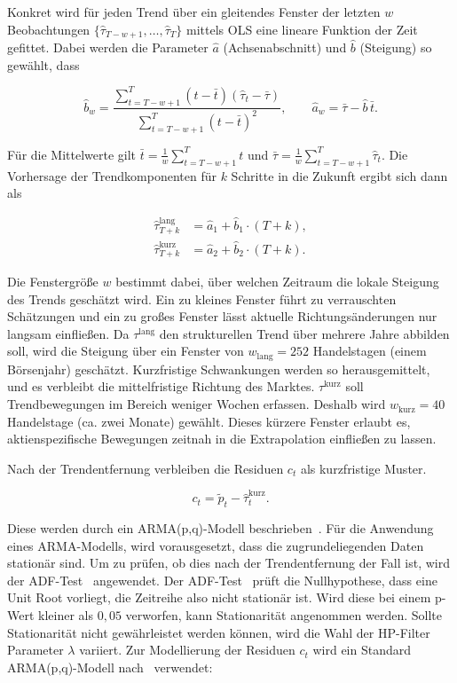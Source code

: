 Konkret wird für jeden Trend über ein gleitendes Fenster der letzten $w$ Beobachtungen $\{\hat{\tau}_{T-w+1}, \ldots, \hat{\tau}_T\}$ mittels \ac{OLS} eine lineare Funktion der Zeit gefittet. Dabei werden die Parameter $\hat{a}$ (Achsenabschnitt) und $\hat{b}$ (Steigung) so gewählt, dass

\begin{equation}
    \hat{b}_w = \frac{\sum_{t=T-w+1}^{T} (t - \bar{t})(\hat{\tau}_t - \bar{\tau})}{\sum_{t=T-w+1}^{T} (t - \bar{t})^2}, \qquad \hat{a}_w = \bar{\tau} - \hat{b}\,\bar{t}.
\end{equation}

Für die Mittelwerte gilt $\bar{t} = \frac{1}{w}\sum_{t=T-w+1}^{T} t$ und $\bar{\tau} = \frac{1}{w}\sum_{t=T-w+1}^{T} \hat{\tau}_t$. Die Vorhersage der Trendkomponenten für $k$ Schritte in die Zukunft ergibt sich dann als

\begin{align}
    \hat{\tau}^{\text{lang}}_{T+k} & = \hat{a}_1 + \hat{b}_1 \cdot (T+k), \\
    \hat{\tau}^{\text{kurz}}_{T+k} & = \hat{a}_2 + \hat{b}_2 \cdot (T+k).
\end{align}

Die Fenstergröße $w$ bestimmt dabei, über welchen Zeitraum die lokale Steigung des Trends geschätzt wird. Ein zu kleines Fenster führt zu verrauschten Schätzungen und ein zu großes Fenster lässt aktuelle Richtungsänderungen nur langsam einfließen. Da $\tau^{\text{lang}}$ den strukturellen Trend über mehrere Jahre abbilden soll, wird die Steigung über ein Fenster von $w_{\text{lang}} = 252$ Handelstagen (einem Börsenjahr) geschätzt. Kurzfristige Schwankungen werden so herausgemittelt, und es verbleibt die mittelfristige Richtung des Marktes. $\tau^{\text{kurz}}$ soll Trendbewegungen im Bereich weniger Wochen erfassen. Deshalb wird $w_{\text{kurz}} = 40$ Handelstage (ca. zwei Monate) gewählt. Dieses kürzere Fenster erlaubt es, aktienspezifische Bewegungen zeitnah in die Extrapolation einfließen zu lassen.

Nach der Trendentfernung verbleiben die Residuen $c_t$ als kurzfristige Muster.

\[
    c_t = \tilde{p}_t - \hat{\tau}^{\text{kurz}}_t.
\]

Diese werden durch ein \ac{ARMA}(p,q)-Modell beschrieben~\cite{box2015time}. Für die Anwendung eines \ac{ARMA}-Modells, wird vorausgesetzt, dass die zugrundeliegenden Daten stationär sind. Um zu prüfen, ob dies nach der Trendentfernung der Fall ist, wird der \ac{ADF}-Test~\cite{dickey1979distribution} angewendet. Der \ac{ADF}-Test~\cite{dickey1979distribution} prüft die Nullhypothese, dass eine Unit Root vorliegt, die Zeitreihe also nicht stationär ist. Wird diese bei einem p-Wert kleiner als 0${,}05$ verworfen, kann
Stationarität angenommen werden. Sollte Stationarität nicht gewährleistet werden können, wird die Wahl der \ac{HP}-Filter Parameter $\lambda$ variiert.
Zur Modellierung der Residuen $c_t$ wird ein Standard \ac{ARMA}(p,q)-Modell nach~\cite{box2015time} verwendet:


